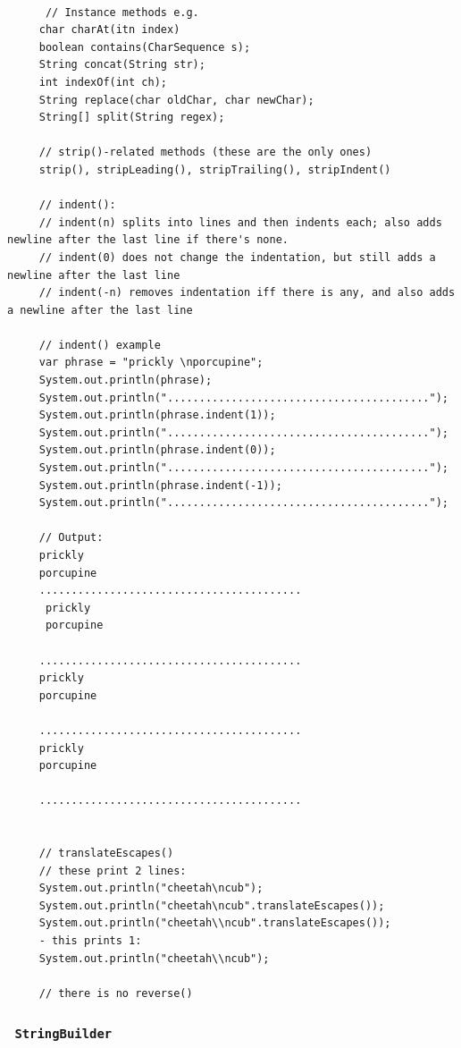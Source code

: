 \documentclass{scrartcl}
\begin{document}
    \begin{lstlisting}

      // Instance methods e.g.
     char charAt(itn index)
     boolean contains(CharSequence s);
     String concat(String str);
     int indexOf(int ch);
     String replace(char oldChar, char newChar);
     String[] split(String regex);

     // strip()-related methods (these are the only ones)
     strip(), stripLeading(), stripTrailing(), stripIndent()

     // indent():
     // indent(n) splits into lines and then indents each; also adds newline after the last line if there's none.
     // indent(0) does not change the indentation, but still adds a newline after the last line
     // indent(-n) removes indentation iff there is any, and also adds a newline after the last line

     // indent() example
     var phrase = "prickly \nporcupine";
     System.out.println(phrase);
     System.out.println(".........................................");
     System.out.println(phrase.indent(1));
     System.out.println(".........................................");
     System.out.println(phrase.indent(0));
     System.out.println(".........................................");
     System.out.println(phrase.indent(-1));
     System.out.println(".........................................");

     // Output:
     prickly
     porcupine
     .........................................
      prickly
      porcupine

     .........................................
     prickly
     porcupine

     .........................................
     prickly
     porcupine

     .........................................


     // translateEscapes()
     // these print 2 lines:
     System.out.println("cheetah\ncub");
     System.out.println("cheetah\ncub".translateEscapes());
     System.out.println("cheetah\\ncub".translateEscapes());
     - this prints 1:
     System.out.println("cheetah\\ncub");

     // there is no reverse()
     \end{lstlisting}

 \subsubsection{\lstinline$ StringBuilder $}
\end{document}
